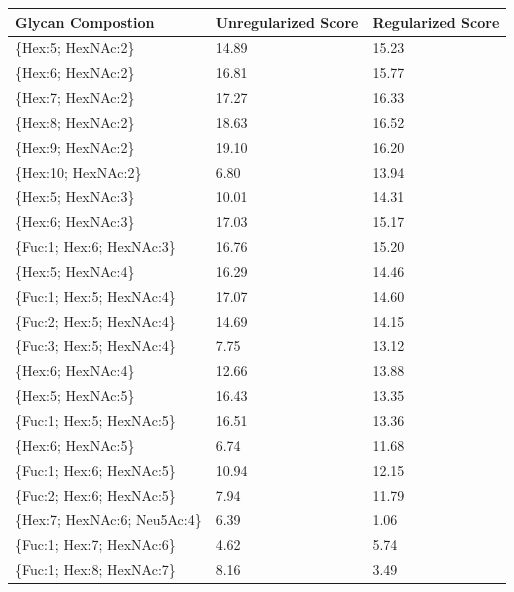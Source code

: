 \begin{table}
\begin{minipage}[t]{0.55\linewidth}
    \begin{footnotesize}
    \begin{tabular}{l|p{2cm} p{2cm}}
Glycan Compostion &  Unregularized Score &  Regularized Score \\
\hline
\{Hex:5; HexNAc:2\}           &                14.89 &              15.23 \\
\{Hex:6; HexNAc:2\}           &                16.81 &              15.77 \\
\{Hex:7; HexNAc:2\}           &                17.27 &              16.33 \\
\{Hex:8; HexNAc:2\}           &                18.63 &              16.52 \\
\{Hex:9; HexNAc:2\}           &                19.10 &              16.20 \\
\{Hex:10; HexNAc:2\}          &                 6.80 &              13.94 \\
\{Hex:5; HexNAc:3\}           &                10.01 &              14.31 \\
\{Hex:6; HexNAc:3\}           &                17.03 &              15.17 \\
\{Fuc:1; Hex:6; HexNAc:3\}    &                16.76 &              15.20 \\
\{Hex:5; HexNAc:4\}           &                16.29 &              14.46 \\
\{Fuc:1; Hex:5; HexNAc:4\}    &                17.07 &              14.60 \\
\{Fuc:2; Hex:5; HexNAc:4\}    &                14.69 &              14.15 \\
\{Fuc:3; Hex:5; HexNAc:4\}    &                 7.75 &              13.12 \\
\{Hex:6; HexNAc:4\}           &                12.66 &              13.88 \\
\{Hex:5; HexNAc:5\}           &                16.43 &              13.35 \\
\{Fuc:1; Hex:5; HexNAc:5\}    &                16.51 &              13.36 \\
\{Hex:6; HexNAc:5\}           &                 6.74 &              11.68 \\
\{Fuc:1; Hex:6; HexNAc:5\}    &                10.94 &              12.15 \\
\{Fuc:2; Hex:6; HexNAc:5\}    &                 7.94 &              11.79 \\
\{Hex:7; HexNAc:6; Neu5Ac:4\} &                 6.39 &               1.06 \\
\{Fuc:1; Hex:7; HexNAc:6\}    &                 4.62 &               5.74 \\
\{Fuc:1; Hex:8; HexNAc:7\}    &                 8.16 &               3.49 \\
\end{tabular}


\end{footnotesize}
\end{minipage}
\end{table}
